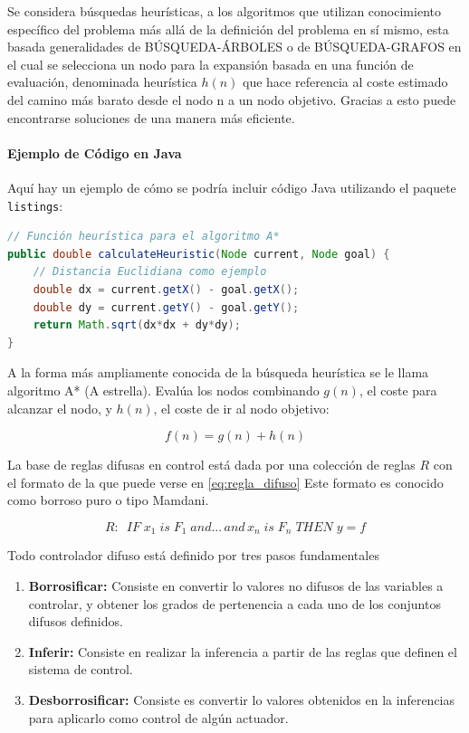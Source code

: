 Se considera búsquedas heurísticas, a los algoritmos que utilizan conocimiento específico del problema más allá de la definición del problema en sí mismo, esta basada generalidades de BÚSQUEDA-ÁRBOLES o de BÚSQUEDA-GRAFOS en el cual se selecciona un nodo para la expansión basada en una función de evaluación, denominada heurística $h(n)$ que hace referencia al coste estimado del camino más barato desde el nodo n a un nodo objetivo. Gracias a esto puede encontrarse soluciones de una manera más eficiente.

\paragraph{Ejemplo de Código en Java}
Aquí hay un ejemplo de cómo se podría incluir código Java utilizando el paquete \texttt{listings}:

\begin{lstlisting}[language=Java, caption=Ejemplo de cálculo de heurística A*, label=lst:a-star-heuristic]
// Función heurística para el algoritmo A*
public double calculateHeuristic(Node current, Node goal) {
    // Distancia Euclidiana como ejemplo
    double dx = current.getX() - goal.getX();
    double dy = current.getY() - goal.getY();
    return Math.sqrt(dx*dx + dy*dy);
}
\end{lstlisting}

A la forma más ampliamente conocida de la búsqueda heurística se le llama algoritmo	A* (A estrella). Evalúa los nodos combinando $g(n)$, el coste para alcanzar el nodo, y $h(n)$, el coste de ir al nodo objetivo:

\begin{equation} \label{eq:heuristica}
	f(n)=g(n)+h(n)
\end{equation}

La base de reglas difusas en control está dada por una colección de reglas $R$ con el formato de la que puede verse en \ref{eq:regla_difuso} Este formato es conocido como borroso puro o tipo Mamdani.

\begin{equation} \label{eq:regla_difuso}
	R: \;\: IF\; x_{1}\; is\; F_{1}\; and...\, and\, x_{n}\; is\; F_{n}\; THEN\; y=f
\end{equation}

Todo controlador difuso está definido por tres pasos fundamentales\
\begin{enumerate}
	\item \textbf{Borrosificar:} Consiste en convertir lo valores no difusos de las variables a controlar, y obtener los grados de pertenencia a cada uno de los conjuntos difusos definidos.
	
	\item \textbf{Inferir:} Consiste en realizar la inferencia a partir de las reglas que definen el sistema de control.
	
	\item \textbf{Desborrosificar:} Consiste es convertir lo valores obtenidos en la inferencias para aplicarlo como control de algún actuador.
\end{enumerate}

